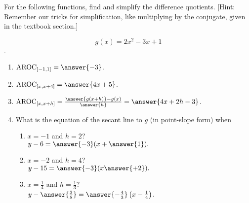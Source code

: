\documentclass{ximera}
\author{Elizabeth Campolongo}
\begin{document}
\begin{exercise}

For the following functions, 
find and simplify the difference quotients. [Hint: Remember our tricks for simplification, like multiplying by the conjugate, given in the textbook section.]

$$g(x)= 2x^2 -3x+1$$.

\begin{enumerate}

\item $\av_{[-1,1]} = \answer{-3}$.

\item $\av_{[x,x+4]} =  \answer{4x+5}$.

\item $\av_{[x,x+h]} = \frac{\answer{g(x+h)}-g(x)}{\answer{h}}  = \answer{4x + 2h - 3}$.  

\item What is the equation of the secant line to $g$ (in point-slope form) when 
\begin{enumerate}
\item $x=-1$ and $h = 2$? \\
$y-6= \answer{-3}(x +\answer{1}).$

\item $x=-2$ and $h = 4$? \\
$y - 15 = \answer{-3}(x \answer{+2}).$

\item $x=\frac{1}{4}$ and $h = \frac{1}{3}$?\\
$y -\answer{\frac{3}{8}} = \answer{-\frac{4}{3}}\left(x-\frac{1}{4}\right)$.
\end{enumerate}


\end{enumerate}
\end{exercise}
\end{document}

